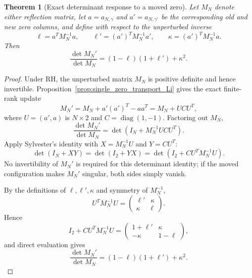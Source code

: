 \documentclass[preprint,12pt]{elsarticle}
\numberwithin{equation}{section}
\theoremstyle{plain}
\newtheorem{theorem}{Theorem}[section]
\theoremstyle{definition}
\theoremstyle{remark}
\newcommand{\RH}{\mathrm{RH}}
\begin{document}
\begin{theorem}[Exact determinant response to a moved zero]
\label{thm:moved_zero_determinant_ratio}
Let $M_N$ denote either reflection matrix, let $a=a_{N,\gamma}$ and $a'=a_{N,\gamma'}$ be the corresponding old and new zero columns, and define with respect to the \emph{unperturbed} inverse
\begin{equation}
\ell=a^TM_N^{-1}a,
\qquad
\ell'=(a')^TM_N^{-1}a',
\qquad
\kappa=(a')^TM_N^{-1}a.
\label{eq:moved_zero_leverages}
\end{equation}
Then
\begin{equation}
\boxed{
\frac{\det M_N'}{\det M_N}
=(1-\ell)(1+\ell')+\kappa^2.}
\label{eq:exact_moved_zero_ratio}
\end{equation}
\end{theorem}

\begin{proof}
Under $\RH$, the unperturbed matrix $M_N$ is positive definite and hence invertible.  Proposition~\ref{prop:single_zero_transport_Li} gives the exact finite-rank update
\begin{equation}
M_N'=M_N+a'(a')^T-aa^T=M_N+UCU^T,
\end{equation}
where $U=(a',a)$ is $N\times2$ and $C=\operatorname{diag}(1,-1)$.  Factoring out $M_N$,
\begin{equation}
\frac{\det M_N'}{\det M_N}
=\det(I_N+M_N^{-1}UCU^T).
\end{equation}
Apply Sylvester's identity with $X=M_N^{-1}U$ and $Y=CU^T$:
\begin{equation}
\det(I_N+XY)=\det(I_2+YX)
=\det(I_2+CU^TM_N^{-1}U).
\end{equation}
No invertibility of $M_N'$ is required for this determinant identity; if the moved configuration makes $M_N'$ singular, both sides simply vanish.

By the definitions of $\ell,\ell',\kappa$ and symmetry of $M_N^{-1}$,
\begin{equation}
U^TM_N^{-1}U
=\begin{pmatrix}\ell'&\kappa\\\kappa&\ell\end{pmatrix}.
\end{equation}
Hence
\begin{equation}
I_2+CU^TM_N^{-1}U
=\begin{pmatrix}1+\ell'&\kappa\\-\kappa&1-\ell\end{pmatrix},
\end{equation}
and direct evaluation gives
\begin{equation}
\frac{\det M_N'}{\det M_N}
=(1-\ell)(1+\ell')+\kappa^2.
\end{equation}
\end{proof}
\end{document}
